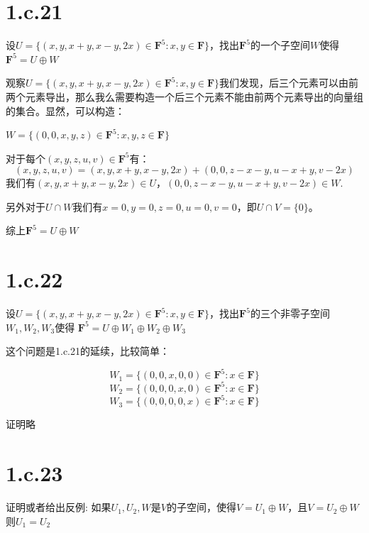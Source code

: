 \documentclass[10pt,a4paper,UTF8]{article}
\begin{document}
\section*{1.c.21}
\label{sec:orge8628bb}


\begin{problem}
设\(U=\{(x,y,x+y,x-y,2x)\in \mathbf{F}^{5}:x,y\in \mathbf{F}\}\)，找出\(\mathbf{F}^{5}\)的一个子空间\(W\)使得 \(\mathbf{F}^{5} = U\oplus W\)
\end{problem}

\begin{answer}
观察\(U=\{(x,y,x+y,x-y,2x)\in \mathbf{F}^{5}:x,y\in \mathbf{F}\}\)我们发现，后三个元素可以由前两个元素导出，那么我么需要构造一个后三个元素不能由前两个元素导出的向量组的集合。显然，可以构造：

\(W=\{(0,0,x,y,z)\in \mathbf{F}^{5}:x,y,z\in \mathbf{F}\}\)

对于每个\((x,y,z,u,v)\in \mathbf{F}^{5}\)有：
\[(x,y,z,u,v) = (x,y,x+y,x-y,2x) + (0,0,z-x-y,u-x+y,v-2x)\] 我们有\((x,y,x+y,x-y,2x) \in U\)，\((0,0,z-x-y,u-x+y,v-2x) \in W\).

另外对于\(U\cap W\)我们有\(x=0,y=0,z=0,u=0,v=0\)，即\(U\cap V = \{0\}\)。

综上\(\mathbf{F}^{5} = U\oplus W\)
\end{answer}
\section*{1.c.22}
\label{sec:org6531141}


\begin{problem}
设\(U=\{(x,y,x+y,x-y,2x)\in \mathbf{F}^{5}:x,y\in \mathbf{F}\}\)，找出\(\mathbf{F}^{5}\)的三个非零子空间\(W_{1},W_{2},W_{3}\)使得 \(\mathbf{F}^{5} = U\oplus W_{1} \oplus W_{2} \oplus W_{3}\)
\end{problem}

\begin{answer}
这个问题是1.c.21的延续，比较简单：

\[W_{1}=\{(0,0,x,0,0)\in \mathbf{F}^{5}:x\in \mathbf{F}\}\]
\[W_{2}=\{(0,0,0,x,0)\in \mathbf{F}^{5}:x\in \mathbf{F}\}\]
\[W_{3}=\{(0,0,0,0,x)\in \mathbf{F}^{5}:x\in \mathbf{F}\}\]

证明略
\end{answer}
\section*{1.c.23}
\label{sec:orgd806898}


\begin{problem}
证明或者给出反例: 如果\(U_{1},U_{2},W\)是\(V\)的子空间，使得\(V = U_{1} \oplus W\)，且\(V = U_{2}\oplus W\) 则\(U_{1} = U_{2}\)
\end{problem}
\end{document}
